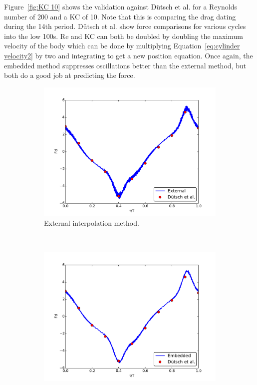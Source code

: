 Figure~\ref{fig:KC 10} shows the validation against D\"{u}tsch et al. for a Reynolds number of 200 and a KC of 10. 
Note that this is comparing the drag dating during the 14th period. 
D\"{u}tsch et al. show force comparisons for various cycles into the low 100s.
Re and KC can both be doubled by doubling the maximum velocity of the body which can be done by multiplying Equation~\eqref{eq:cylinder velocity2} by two and integrating to get a new position equation.
Once again, the embedded method suppresses oscillations better than the external method, but both do a good job at predicting the force. 
\begin{figure}[!htb]
	\centering
	\par\medskip
	\begin{subfigure}{0.4\textwidth}
		\includegraphics[width=\linewidth]{External_static_kc10}
		\caption{External interpolation method.}
	\end{subfigure}
	~
	\begin{subfigure}{0.4\textwidth}
		\includegraphics[width=\linewidth]{Embedded_static_kc10}

\end{subfigure}
\end{figure}
